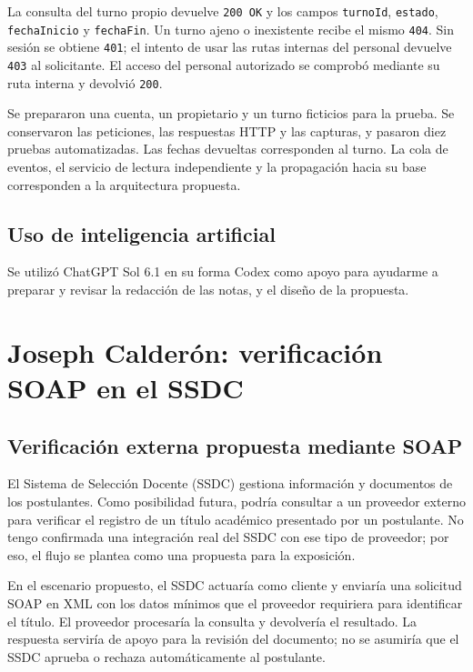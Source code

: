 \documentclass[10pt,a4paper,twocolumn]{article}
\begin{document}
La consulta del turno propio devuelve \texttt{200 OK} y los campos \texttt{turnoId}, \texttt{estado}, \texttt{fechaInicio} y \texttt{fechaFin}. Un turno ajeno o inexistente recibe el mismo \texttt{404}. Sin sesión se obtiene \texttt{401}; el intento de usar las rutas internas del personal devuelve \texttt{403} al solicitante. El acceso del personal autorizado se comprobó mediante su ruta interna y devolvió \texttt{200}.



Se prepararon una cuenta, un propietario y un turno ficticios para la prueba. Se conservaron las peticiones, las respuestas HTTP y las capturas, y pasaron diez pruebas automatizadas. Las fechas devueltas corresponden al turno. La cola de eventos, el servicio de lectura independiente y la propagación hacia su base corresponden a la arquitectura propuesta.



\subsection{Uso de inteligencia artificial}

Se utilizó ChatGPT Sol 6.1 en su forma Codex como apoyo para ayudarme a preparar y revisar la redacción de las notas, y el diseño de la propuesta.


\section{Joseph Calderón: verificación SOAP en el SSDC}
\subsection{Verificación externa propuesta mediante SOAP}

El Sistema de Selección Docente (SSDC) gestiona información y documentos de
los postulantes. Como posibilidad futura, podría consultar a un proveedor
externo para verificar el registro de un título académico presentado por un
postulante. No tengo confirmada una integración real del SSDC con ese tipo de
proveedor; por eso, el flujo se plantea como una propuesta para la exposición.

En el escenario propuesto, el SSDC actuaría como cliente y enviaría una
solicitud SOAP en XML con los datos mínimos que el proveedor requiriera para
identificar el título. El proveedor procesaría la consulta y devolvería el
resultado. La respuesta serviría de apoyo para la revisión del documento; no
se asumiría que el SSDC aprueba o rechaza automáticamente al postulante.
\end{document}
